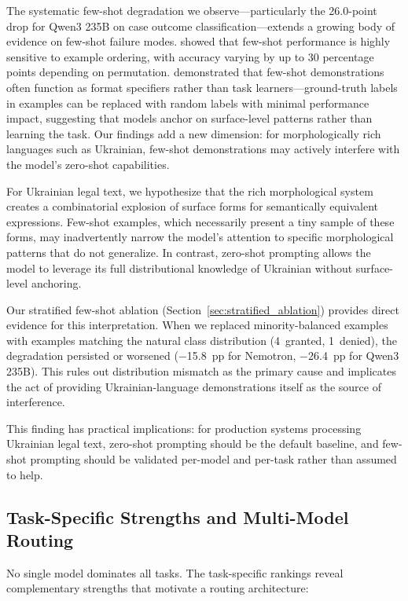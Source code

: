 \documentclass[11pt,a4paper]{article}
\begin{document}
The systematic few-shot degradation we observe---particularly the 26.0-point drop for Qwen3 235B on case outcome classification---extends a growing body of evidence on few-shot failure modes. \citet{lu2022order} showed that few-shot performance is highly sensitive to example ordering, with accuracy varying by up to 30 percentage points depending on permutation. \citet{min2022rethinking} demonstrated that few-shot demonstrations often function as format specifiers rather than task learners---ground-truth labels in examples can be replaced with random labels with minimal performance impact, suggesting that models anchor on surface-level patterns rather than learning the task. Our findings add a new dimension: for morphologically rich languages such as Ukrainian, few-shot demonstrations may actively interfere with the model's zero-shot capabilities.

For Ukrainian legal text, we hypothesize that the rich morphological system creates a combinatorial explosion of surface forms for semantically equivalent expressions. Few-shot examples, which necessarily present a tiny sample of these forms, may inadvertently narrow the model's attention to specific morphological patterns that do not generalize. In contrast, zero-shot prompting allows the model to leverage its full distributional knowledge of Ukrainian without surface-level anchoring.

Our stratified few-shot ablation (Section~\ref{sec:stratified_ablation}) provides direct evidence for this interpretation. When we replaced minority-balanced examples with examples matching the natural class distribution (4~granted, 1~denied), the degradation persisted or worsened ($-$15.8~pp for Nemotron, $-$26.4~pp for Qwen3 235B). This rules out distribution mismatch as the primary cause and implicates the act of providing Ukrainian-language demonstrations itself as the source of interference.

This finding has practical implications: for production systems processing Ukrainian legal text, zero-shot prompting should be the default baseline, and few-shot prompting should be validated per-model and per-task rather than assumed to help.

\subsection{Task-Specific Strengths and Multi-Model Routing}
\label{sec:routing}

No single model dominates all tasks. The task-specific rankings reveal complementary strengths that motivate a routing architecture:
\end{document}
